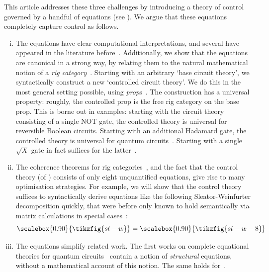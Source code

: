 \documentclass[a4paper]{article}
\theoremstyle{plain}
\theoremstyle{definition}
\newcommand{\tf}[1]{\scalebox{0.90}{\tikzfig{#1}}}
\begin{document}
This article addresses these three challenges by introducing a theory of control governed by a handful of equations (see ). We argue that these equations completely capture control as follows.
\begin{enumerate}[(i)]
	\item
		The equations have clear computational interpretations, and several have appeared in the literature before~\cite{sharmaachour:optimizing,thomsenkaarsgaardsoeken:ricercar}.
		Additionally, we show that the equations are canonical in a strong way, by relating them to the natural mathematical notion of a \emph{rig category}~\cite{laplaza1972coherence,bimonoidal-book}.
		Starting with an arbitrary `base circuit theory', we syntactically construct a new `controlled circuit theory'. We do this in the most general setting possible, using \emph{prop}s~\cite{maclane:props,ghicajung:digitalcircuits,bonchisobocinskizanasi:hopf}. The construction has a universal property: roughly, the controlled prop is the free rig category on the base prop.
		This is borne out in examples: starting with the circuit theory consisting of a single NOT gate, the controlled theory is universal for reversible Boolean circuits. Starting with an additional Hadamard gate, the controlled theory is universal for quantum circuits~\cite{shi:aharonov}. Starting with a single $\sqrt{X}$ gate in fact suffices for the latter~\cite{kaarsgaard:ctrlv}.

	\item
		The coherence theorems for rig categories~\cite{laplaza1972coherence,bimonoidal-book}, and the fact that the control theory (of ) consists of only eight unquantified equations, give rise to many optimisation strategies.
		For example, we will show that the control theory suffices to syntactically derive equations like the following Sleator-Weinfurter decomposition quickly, that were before only known to hold semantically via matrix calculations in special cases~\cite{sleatorweinfurter,carette2024easy}:
		\[
			\tf{sl-w}
			=
			\tf{sl-w-8}
		\]

	\item The equations simplify related work. The first works on complete
		equational theories for quantum circuits~\cite{clementetal:complete,
		clementetal:minimal, clementetal:extensions} contain a notion of
		\emph{structural} equations, without a mathematical account of this
		notion. The same holds for~\cite{bianselinger:cliffordt,
		bianselinger:unitaries, lirossselinger:orthogonal}. 


\end{enumerate}
\end{document}
